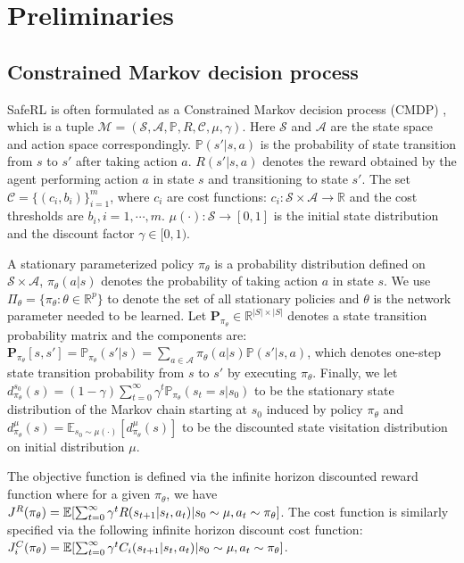 \documentclass{article}
\begin{document}
\section{Preliminaries}
\subsection{Constrained Markov decision process}
SafeRL \cite{altman2021constrained, sutton2018reinforcement} is often formulated as a Constrained Markov decision process (CMDP) \cite{altman2021constrained}, which is a tuple $\mathcal{M} = (\mathcal{S}, \mathcal{A}, \mathbb{P}, R, \mathcal{C}, \mu, \gamma)$. Here $\mathcal{S}$ and $\mathcal{A}$ are the state space and action space correspondingly. $\mathbb{P}(s'| s,a)$ is the probability of state transition from $s$ to $s'$ after taking action $a$. $R(s' | s,a)$ denotes the reward obtained by the agent performing action $a$ in state $s$ and transitioning to state $s'$. The set $\mathcal{C} = \big\{ (c_i, b_i) \big\}_{i=1}^m$, where $c_i$ are cost functions: $c_i: \mathcal{S} \times \mathcal{A} \rightarrow \mathbb{R}$ and the cost thresholds are $b_i, i = 1, \cdots, m$. $\mu(\cdot): \mathcal{S} \rightarrow [0, 1]$ is the initial state distribution and the discount factor $\gamma \in [0, 1)$. 

A stationary parameterized policy $\pi_{\theta}$ is a probability distribution defined on $\mathcal{S} \times \mathcal{A}$, $\pi_{\theta}(a|s)$ denotes the probability of taking action $a$ in state $s$. We use $\Pi_{\theta} = \{\pi_{\theta}: \theta \in \mathbb{R}^p\}$ to denote the set of all stationary policies and $\theta$ is the network parameter needed to be learned. Let $\bm{P}_{\pi_\theta} \in \mathbb{R} ^{|S| \times |S|}$ denotes a state transition probability matrix and the components are: $\bm{P}_{\pi_\theta} [s, s'] = \mathbb{P}_{\pi_\theta}(s'|s) = \sum_{a \in \mathcal{A}} \pi_\theta(a|s)\mathbb{P}(s'|s, a)$, which denotes one-step state transition probability from $s$ to $s'$ by executing $\pi_\theta$. Finally, we let $d_{\pi_\theta}^{s_0}(s) = (1 - \gamma) \sum_{t=0}^\infty \gamma^t \mathbb{P}_{\pi_\theta}(s_t=s | s_0)$ to be the stationary state distribution of the Markov chain starting at $s_0$ induced by policy $\pi_\theta$ and $d_{\pi_\theta}^{\mu}(s) = \mathbb{E}_{s_0 \sim \mu(\cdot)} [d_{\pi_\theta}^{\mu}(s)]$ to be the discounted state visitation distribution on initial distribution $\mu$.

The objective function is defined via the infinite horizon discounted reward function where for a given $\pi_\theta$, we have $J^R(\pi_\theta) = \mathbb{E} \qty[ \sum_{t=0}^{\infty} \gamma^t R(s_{t+1} | s_t, a_t) \middle| s_0 \sim \mu, a_t \sim \pi_\theta ]$. The cost function is similarly specified via the following infinite horizon discount cost function: $ J^C_i(\pi_\theta) = \mathbb{E} \qty[ \sum_{t=0}^{\infty} \gamma^t C_i(s_{t+1} | s_t, a_t) \middle| s_0 \sim \mu, a_t \sim \pi_\theta ]$.
\end{document}
